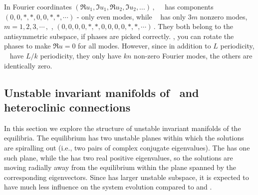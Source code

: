 In Fourier coordinates 
\(
(\Re u_1, \Im u_1, \Re u_2, \Im u_2, ...)
\,,
\)
 ~\eqv\ has components \(
(0, 0, *, *, 0, 0, *, *,\cdots)
\) - only even modes, while ~{\eqv}
has only $3m$ nonzero modes, 
\(
m = 1, 2, 3, \cdots\,,
\)
\ie,
\(
(0,0,0,0,*,*,0,0,0,0,*,*,\cdots)
\,.
\)  
They both belong to the antisymmetric subspace, if phases are picked
correctly.  
\ie,
you can rotate the phases to make 
\( \Re u = 0 \)
for all modes. However,
since in addition to 
$L$ periodicity, ~{\eqv} have
$L/k$ periodicity, they only have 
$kn$ non-zero Fourier modes, the others are identically zero.


\subsection{Unstable invariant manifolds of \eqva\ and heteroclinic
connections}

In this section we explore the structure of unstable invariant
manifolds of the equilibria.  The  equilibrium has two unstable
planes within which the solutions are spiralling out (i.e., two
pairs of complex conjugate eigenvalues).  The  has one such plane,
while the  has two real positive eigenvalues, so the solutions are
moving radially away from the equilibrium within the plane spanned
by the corresponding eigenvectors.  Since  has larger unstable
subspace, it is expected to have much less influence on the system
evolution compared to  and .

